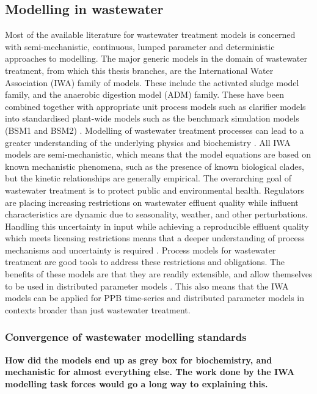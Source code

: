 \subsection{Modelling in wastewater}

Most of the available literature for wastewater treatment models is concerned with semi-mechanistic, continuous, lumped parameter and deterministic approaches to modelling. The major generic models in the domain of wastewater treatment, from which this thesis branches, are the International Water Association (IWA) family of models. These include the activated sludge model family, and the anaerobic digestion model (ADM) \cite{batstone2006} family. These have been combined together with appropriate unit process models such as clarifier models \cite{takacs1991} into standardised plant-wide models such as the benchmark simulation models (BSM1 and BSM2) \cite{jeppsson2007, beraud2007}. Modelling of wastewater treatment processes can lead to a greater understanding of the underlying physics and biochemistry \cite{szilvester2010}. All IWA models are semi-mechanistic, which means that the model equations are based on known mechanistic phenomena, such as the presence of known biological clades, but the kinetic relationships are generally empirical.
\skippingparagraph
The overarching goal of wastewater treatment is to protect public and environmental health. Regulators are placing increasing restrictions on wastewater effluent quality while influent characteristics are dynamic due to seasonality, weather, and other perturbations. Handling this uncertainty in input while achieving a reproducible effluent quality which meets licensing restrictions means that a deeper understanding of process mechanisms and uncertainty is required \cite{solon2019}.
Process models for wastewater treatment are good tools to address these restrictions and obligations. The benefits of these models are that they are readily extensible, and allow themselves to be used in distributed parameter models \cite{batstone2006a}. This also means that the IWA models can be applied for PPB time-series and distributed parameter models in contexts broader than just wastewater treatment. 



\subsubsection{Convergence of wastewater modelling standards}
\textbf{How did the models end up as grey box for biochemistry, and mechanistic for almost everything else. The work done by the IWA modelling task forces would go a long way to explaining this. }

